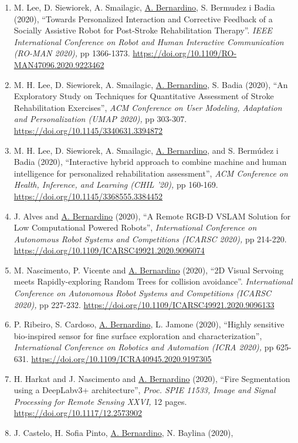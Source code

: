 \documentclass[
]{article}
\begin{document}
\begin{enumerate}
\item
  M. Lee, D. Siewiorek, A. Smailagic, \ul{A. Bernardino}, S. Bermudez i
  Badia (2020), ``Towards Personalized Interaction and Corrective
  Feedback of a Socially Assistive Robot for Post-Stroke Rehabilitation
  Therapy''. \emph{IEEE International Conference on Robot and Human
  Interactive Communication (RO-MAN 2020),} pp 1366-1373.
  \url{https://doi.org/10.1109/RO-MAN47096.2020.9223462}~
\item
  M. H. Lee, D. Siewiorek, A. Smailagic, \ul{A. Bernardino}, S. Badia
  (2020), ``An Exploratory Study on Techniques for Quantitative
  Assessment of Stroke Rehabilitation Exercises'', \emph{ACM Conference
  on User Modeling, Adaptation and Personalization (UMAP 2020),} pp
  303-307. \url{https://doi.org/10.1145/3340631.3394872}~
\item
  M. H. Lee, D. Siewiorek, A. Smailagic, \ul{A. Bernardino}, and S.
  Bermúdez i Badia (2020), ``Interactive hybrid approach to combine
  machine and human intelligence for personalized rehabilitation
  assessment'', \emph{ACM Conference on Health, Inference, and Learning
  (CHIL '20),} pp 160-169.
  \url{https://doi.org/10.1145/3368555.3384452}~
\item
  J. Alves and \ul{A. Bernardino} (2020), ``A Remote RGB-D VSLAM
  Solution for Low Computational Powered Robots'', \emph{International
  Conference on Autonomous Robot Systems and Competitions (ICARSC
  2020),} pp 214-220.
  \url{https://doi.org/10.1109/ICARSC49921.2020.9096074}~
\item
  M. Nascimento, P. Vicente and \ul{A. Bernardino} (2020), ``2D Visual
  Servoing meets Rapidly-exploring Random Trees for collision
  avoidance''. \emph{International Conference on Autonomous Robot
  Systems and Competitions (ICARSC 2020),} pp 227-232.
  \url{https://doi.org/10.1109/ICARSC49921.2020.9096133}~
\item
  P. Ribeiro, S. Cardoso, \ul{A. Bernardino}, L. Jamone (2020), ``Highly
  sensitive bio-inspired sensor for fine surface exploration and
  characterization'', \emph{International Conference on Robotics and
  Automation (ICRA 2020),} pp 625-631.
  \url{https://doi.org/10.1109/ICRA40945.2020.9197305}~
\item
  H. Harkat and J. Nascimento and \ul{A. Bernardino} (2020), ``Fire
  Segmentation using a DeepLabv3+ architecture'', \emph{Proc. SPIE
  11533, Image and Signal Processing for Remote Sensing XXVI,} 12 pages.
  \url{https://doi.org/10.1117/12.2573902}~
\item
  J. Castelo, H. Sofia Pinto, \ul{A. Bernardino}, N. Baylina (2020),

\end{enumerate}
\end{document}
